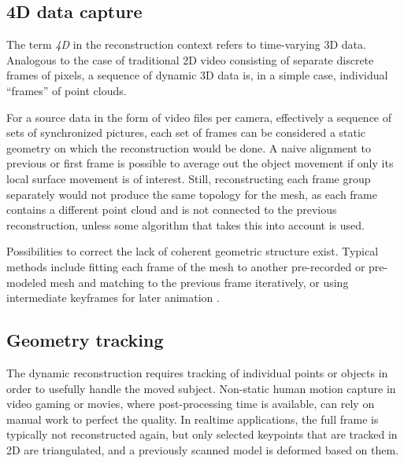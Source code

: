 
\subsection{4D data capture} %

The term \emph{4D} in the reconstruction context refers to time-varying 3D data.
Analogous to the case of traditional 2D video consisting of separate discrete frames of pixels, a sequence of dynamic 3D data is, in a simple case, individual ``frames'' of point clouds.

For a source data in the form of video files per camera, effectively a sequence of sets of synchronized pictures, each set of frames can be considered a static geometry on which the reconstruction would be done.
A naive alignment to previous or first frame is possible to average out the object movement if only its local surface movement is of interest.
Still, reconstructing each frame group separately would not produce the same topology for the mesh, as each frame contains a different point cloud and is not connected to the previous reconstruction, unless some algorithm that takes this into account is used.

Possibilities to correct the lack of coherent geometric structure exist.
Typical methods include fitting each frame of the mesh to another pre-recorded or pre-modeled mesh \cite{bickel2007multi,bradley2010high,li2009robust,zhang2007spacetime} and matching to the previous frame iteratively, or using intermediate keyframes for later animation \cite{beeler2011high}.

\subsection{Geometry tracking} %


The dynamic reconstruction requires tracking of individual points or objects in order to usefully handle the moved subject.
Non-static human motion capture in video gaming or movies, where post-processing time is available, can rely on manual work to perfect the quality.
In realtime applications, the full frame is typically not reconstructed again, but only selected keypoints that are tracked in 2D are triangulated, and a previously scanned model is deformed based on them.


